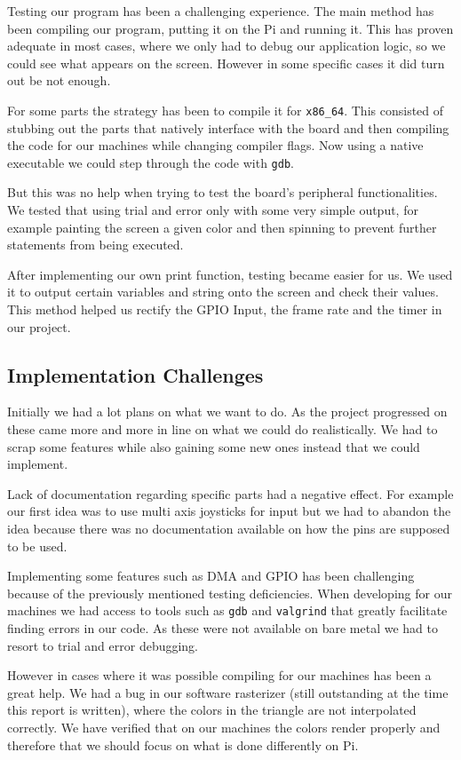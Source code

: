 \documentclass[11pt]{article}
\begin{document}
Testing our program has been a challenging experience. The main method has been
compiling our program, putting it on the Pi and running it. This has proven
adequate in most cases, where we only had to debug our application logic, so we
could see what appears on the screen. However in some specific cases it did turn
out be not enough.

For some parts the strategy has been to compile it for \texttt{x86\_64}. This
consisted of stubbing out the parts that natively interface with the board and
then compiling the code for our machines while changing compiler flags. Now
using a native executable we could step through the code with \texttt{gdb}.

But this was no help when trying to test the board's peripheral functionalities.
We tested that using trial and error only with some very simple output, for
example painting the screen a given color and then spinning to prevent further
statements from being executed.

After implementing our own print function, testing became easier for us.
We used it to output certain variables and string onto the screen and check
their values. This method helped us rectify the GPIO Input, the frame rate and the
timer in our project.

\subsection{Implementation Challenges}

Initially we had a lot plans on what we want to do. As the project progressed on
these came more and more in line on what we could do realistically. We had to
scrap some features while also gaining some new ones instead that we could
implement.

Lack of documentation regarding specific parts had a negative effect.  For
example our first idea was to use multi axis joysticks for input but we had to
abandon the idea because there was no documentation available on how the pins
are supposed to be used.

Implementing some features such as DMA and GPIO has been challenging because of
the previously mentioned testing deficiencies. When developing for our machines
we had access to tools such as \texttt{gdb} and \texttt{valgrind} that greatly
facilitate finding errors in our code. As these were not available on bare metal
we had to resort to trial and error debugging.

However in cases where it was possible compiling for our machines has been
a great help. We had a bug in our software rasterizer (still outstanding at the
time this report is written), where the colors in the triangle are not
interpolated correctly. We have verified that on our machines the colors render
properly and therefore that we should focus on what is done differently on Pi.
\end{document}
